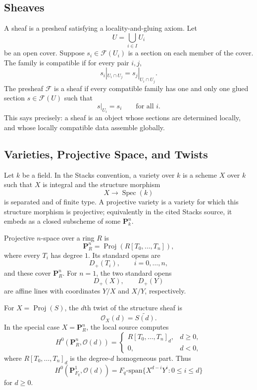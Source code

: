 \subsection{Sheaves}

A sheaf is a presheaf satisfying a locality-and-gluing axiom.  Let
\[
  U=\bigcup_{i\in I}U_i
\]
be an open cover.  Suppose \(s_i\in\mathcal F(U_i)\) is a section on each
member of the cover.  The family is compatible if for every pair \(i,j\),
\[
  s_i|_{U_i\cap U_j}=s_j|_{U_i\cap U_j}.
\]
The presheaf \(\mathcal F\) is a sheaf if every compatible family has one and
only one glued section \(s\in\mathcal F(U)\) such that
\[
  s|_{U_i}=s_i\qquad\text{for all }i.
\]
This says precisely: a sheaf is an object whose sections are determined
locally, and whose locally compatible data assemble globally.

\subsection{Varieties, Projective Space, and Twists}

Let \(k\) be a field.  In the Stacks convention, a variety over \(k\) is a
scheme \(X\) over \(k\) such that \(X\) is integral and the structure morphism
\[
  X\longrightarrow \operatorname{Spec}(k)
\]
is separated and of finite type.  A projective variety is a variety for which
this structure morphism is projective; equivalently in the cited Stacks
source, it embeds as a closed subscheme of some \(\mathbf P^n_k\).

Projective \(n\)-space over a ring \(R\) is
\[
  \mathbf P^n_R=\operatorname{Proj}(R[T_0,\ldots,T_n]),
\]
where every \(T_i\) has degree \(1\).  Its standard opens are
\[
  D_+(T_i),\qquad i=0,\ldots,n,
\]
and these cover \(\mathbf P^n_R\).  For \(n=1\), the two standard opens
\[
  D_+(X),\qquad D_+(Y)
\]
are affine lines with coordinates \(Y/X\) and \(X/Y\), respectively.

For \(X=\operatorname{Proj}(S)\), the \(d\)th twist of the structure sheaf is
\[
  \mathcal O_X(d)=\widetilde{S(d)}.
\]
In the special case \(X=\mathbf P^n_R\), the local source computes
\[
  H^0(\mathbf P^n_R,\mathcal O(d))
  =
  \begin{cases}
  R[T_0,\ldots,T_n]_d,& d\geq0,\\
  0,& d<0,
  \end{cases}
\]
where \(R[T_0,\ldots,T_n]_d\) is the degree-\(d\) homogeneous part.  Thus
\[
  H^0(\mathbf P^1_{F_q},\mathcal O(d))
  =
  F_q\text{-span}\{X^{d-i}Y^i:0\leq i\leq d\}
\]
for \(d\geq0\).


